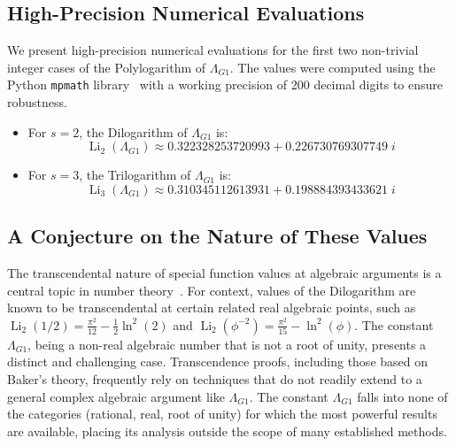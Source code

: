 \documentclass{amsart}
\theoremstyle{plain}
\theoremstyle{definition}
\theoremstyle{remark}
\DeclareMathOperator{\Li}{Li}
\newcommand{\LambdaG}{\Lambda_{G1}}
\newcommand{\phiG}{\phi}
\begin{document}
\subsection{High-Precision Numerical Evaluations}
We present high-precision numerical evaluations for the first two non-trivial integer cases of the Polylogarithm of $\LambdaG$. The values were computed using the Python \texttt{mpmath} library~\cite{mpmath} with a working precision of 200 decimal digits to ensure robustness.
\begin{itemize}
    \item For $s=2$, the Dilogarithm of $\LambdaG$ is:
    \[ \Li_2(\LambdaG) \approx 0.322328253720993 + 0.226730769307749\;i \]
    
    \item For $s=3$, the Trilogarithm of $\LambdaG$ is:
    \[ \Li_3(\LambdaG) \approx 0.310345112613931 + 0.198884393433621\;i \]
\end{itemize}

\subsection{A Conjecture on the Nature of These Values}
The transcendental nature of special function values at algebraic arguments is a central topic in number theory~\cite{Baker}. For context, values of the Dilogarithm are known to be transcendental at certain related real algebraic points, such as $\Li_2(1/2) = \frac{\pi^2}{12} - \frac{1}{2}\ln^2(2)$ and $\Li_2(\phiG^{-2}) = \frac{\pi^2}{15} - \ln^2(\phiG)$. The constant $\LambdaG$, being a non-real algebraic number that is not a root of unity, presents a distinct and challenging case. Transcendence proofs, including those based on Baker's theory, frequently rely on techniques that do not readily extend to a general complex algebraic argument like $\LambdaG$. The constant $\LambdaG$ falls into none of the categories (rational, real, root of unity) for which the most powerful results are available, placing its analysis outside the scope of many established methods.
\end{document}
